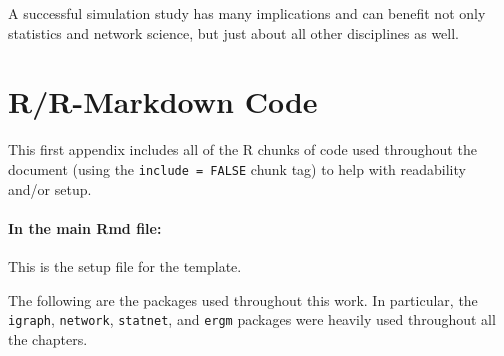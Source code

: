 \documentclass[12pt,twoside]{amherstthesis}
\begin{document}
  A successful simulation study has many implications and can benefit not
  only statistics and network science, but just about all other
  disciplines as well.
  
  \singlespacing
  \appendix
  
  \chapter{R/R-Markdown Code}\label{rr-markdown-code}
  
  This first appendix includes all of the R chunks of code used throughout
  the document (using the \texttt{include\ =\ FALSE} chunk tag) to help
  with readability and/or setup.
  
  \subsubsection{In the main Rmd file:}\label{in-the-main-rmd-file}
  
  This is the setup file for the template.
  
  \begin{Shaded}
  \begin{Highlighting}[]
    \NormalTok{(}\NormalTok{, } \NormalTok{)}
    \NormalTok{(}\NormalTok{)}
  \NormalTok{\}}
  \end{Highlighting}
  \end{Shaded}
  
  The following are the packages used throughout this work. In particular,
  the \texttt{igraph}, \texttt{network}, \texttt{statnet}, and
  \texttt{ergm} packages were heavily used throughout all the chapters.
  
  \begin{Shaded}
  \begin{Highlighting}[]
  
  \NormalTok{(} \NormalTok{)}
  \NormalTok{(} \NormalTok{)}
  \end{Highlighting}
  \end{Shaded}
  
\end{document}
